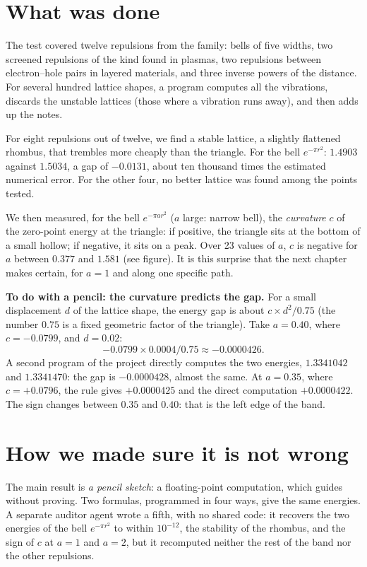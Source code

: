 \section*{What was done}

The test covered twelve repulsions from the family: bells of five widths, two screened
repulsions of the kind found in plasmas, two repulsions between electron--hole pairs in layered
materials, and three inverse powers of the distance. For several hundred lattice shapes, a
program computes all the vibrations, discards the unstable lattices (those where a vibration
runs away), and then adds up the notes.

For eight repulsions out of twelve, we find a stable lattice, a slightly flattened rhombus,
that trembles more cheaply than the triangle. For the bell $e^{-\pi r^2}$: $1.4903$ against
$1.5034$, a gap of $-0.0131$, about ten thousand times the estimated numerical error. For the
other four, no better lattice was found among the points tested.

We then measured, for the bell $e^{-\pi a r^2}$ ($a$ large: narrow bell), the \emph{curvature}
$c$ of the zero-point energy at the triangle: if positive, the triangle sits at the bottom of a
small hollow; if negative, it sits on a peak. Over 23 values of $a$, $c$ is negative for $a$
between $0.377$ and $1.581$ (see figure). It is this surprise that the next chapter makes
certain, for $a=1$ and along one specific path.

\begin{encadre}
\textbf{To do with a pencil: the curvature predicts the gap.} For a small displacement $d$ of
the lattice shape, the energy gap is about $c\times d^2/0.75$ (the number $0.75$ is a fixed
geometric factor of the triangle). Take $a=0.40$, where $c=-0.0799$, and $d=0.02$:
\[-0.0799\times0.0004/0.75\approx-0.0000426.\]
A second program of the project directly computes the two energies, $1.3341042$ and
$1.3341470$: the gap is $-0.0000428$, almost the same. At $a=0.35$, where $c=+0.0796$, the rule
gives $+0.0000425$ and the direct computation $+0.0000422$. The sign changes between $0.35$ and
$0.40$: that is the left edge of the band.
\end{encadre}

\section*{How we made sure it is not wrong}

The main result is  \emph{a pencil sketch}: a floating-point computation, which guides
without proving. Two formulas, programmed in four ways, give the same energies. A separate
auditor agent wrote a fifth, with no shared code: it recovers the two energies of the bell
$e^{-\pi r^2}$ to within $10^{-12}$, the stability of the rhombus, and the sign of $c$ at $a=1$
and $a=2$, but it recomputed neither the rest of the band nor the other repulsions.

